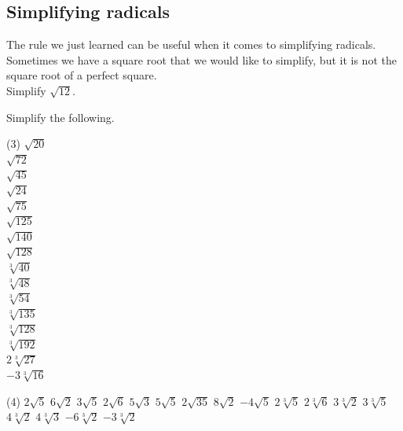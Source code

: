 \documentclass[12pt,fleqn]{book}
\newcommand{\prb}[1]{\begin{Exercise}#1\end{Exercise}}
\newcommand{\sol}[1]{\begin{Answer}#1\end{Answer}}
\begin{document}
\subsection*{Simplifying radicals}
The rule we just learned can be useful when it comes to simplifying radicals.  Sometimes we have a square root that we would like to simplify, but it is not the square root of a perfect square.
\\[1em]
Simplify $\sqrt{12}$.
\\[2in]
\prb{
    Simplify the following.
    \begin{tasks}(3)
        \task $\sqrt{20}$
        \\[1in]
        \task $\sqrt{72}$
        \\[1in]
        \task $\sqrt{45}$
        \\[1in]
        \task $\sqrt{24}$
        \\[1in]
        \task $\sqrt{75}$
        \\[1in]
        \task $\sqrt{125}$
        \\[1in]
        \task $\sqrt{140}$
        \\[1in]
        \task $\sqrt{128}$
        \\[1in]
        \task $\sqrt[3]{40}$
        \\[1in]
        \task $\sqrt[3]{48}$
        \\[1in]
        \task $\sqrt[3]{54}$
        \\[1in]
        \task $\sqrt[3]{135}$
        \\[1in]
        \task $\sqrt[3]{128}$
        \\[1in]
        \task $\sqrt[3]{192}$
        \\[1in]
        \task $2 \sqrt[3]{27}$
        \\[1in]
        \task $-3 \sqrt[3]{16}$
        \\[1in]
    \end{tasks}
}
\sol{
\begin{tasks}(4)
\task $2 \sqrt{5}$
\task $6 \sqrt{2}$
\task $3 \sqrt{5}$
\task $2 \sqrt{6}$
\task $5 \sqrt{3}$
\task $5 \sqrt{5}$
\task $2 \sqrt{35}$
\task $8 \sqrt{2}$
\task $-4 \sqrt{5}$
\task $2 \sqrt[3]{5}$
\task $2 \sqrt[3]{6}$
\task $3 \sqrt[3]{2}$
\task $3 \sqrt[3]{5}$
\task $4 \sqrt[3]{2}$
\task $4 \sqrt[3]{3}$
\task 6
\task $-6 \sqrt[3]{2}$
\task 2
\task $-3 \sqrt[3]{2}$
\end{tasks}
}
\end{document}

